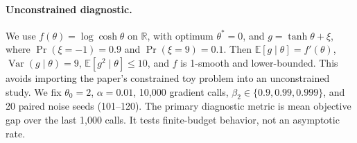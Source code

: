 \paragraph{Unconstrained diagnostic.}
We use $f(\theta)=\log\cosh\theta$ on $\mathbb R$, with optimum $\theta^*=0$, and
$g=\tanh\theta+\xi$, where $\Pr(\xi=-1)=0.9$ and $\Pr(\xi=9)=0.1$.
Then $\mathbb E[g\mid\theta]=f'(\theta)$, $\operatorname{Var}(g\mid\theta)=9$,
$\mathbb E[g^2\mid\theta]\leq10$, and $f$ is 1-smooth and lower-bounded.
This avoids importing the paper's constrained toy problem into an unconstrained study.
We fix $\theta_0=2$, $\alpha=0.01$, 10,000 gradient calls, $\beta_2\in\{0.9,0.99,0.999\}$,
and 20 paired noise seeds (101--120). The primary diagnostic metric is mean objective gap
over the last 1,000 calls. It tests finite-budget behavior, not an asymptotic rate.
